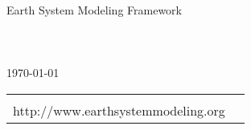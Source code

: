 %


\begin{titlepage}

\begin{center}
{\Large Earth System Modeling Framework } \\
\vspace{.25in}
{\Large {\bf \mytitle}} \\
\vspace{.25in}
{\large {\bf \myversion}} \\
\vspace{.5in}
{\large {\it \myauthors}} \\
\vspace{.25in}
{\large {\today}}
\vspace{.25in}
\end{center}

\begin{latexonly}
\vspace{4.5in}
\begin{tabular}{p{5in}p{.9in}}
\hrulefill \\
\noindent http://www.earthsystemmodeling.org \\
\end{tabular}
\end{latexonly}

\end{titlepage}














